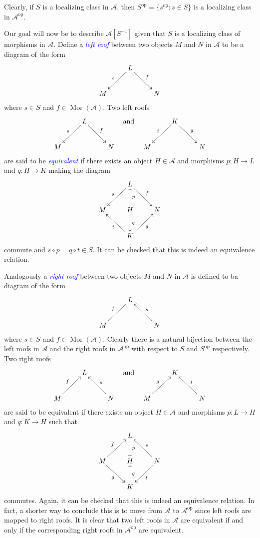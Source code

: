 \documentclass[11pt]{article}
\theoremstyle{thmstyle}
\theoremstyle{defstyle}
\newcommand{\scrA}{\mathscr{A}}
\newcommand{\define}[1]{\textcolor{blue}{\textit{#1}}}
\newcommand{\Mor}{\operatorname{Mor}}
\newcommand{\op}{\mathrm{op}}
\begin{document}
\begin{center}
Clearly, if $S$ is a localizing class in $\scrA$, then $S^\op = \{s^\op\colon s\in S\}$ is a localizing class in $\scrA^\op$.
\end{center}

Our goal will now be to describe $\scrA[S^{-1}]$ given that $S$ is a localizing class of morphisms in $\scrA$. Define a \define{left roof} between two objects $M$ and $N$ in $\scrA$ to be a diagram of the form 
\begin{equation*}
	\xymatrix {
		& L\ar[ld]_s\ar[rd]^f & \\
		M & & N
	}
\end{equation*}
where $s\in S$ and $f\in\Mor(\scrA)$. Two left roofs 
\begin{equation*}
	\xymatrix {
		& L\ar[ld]_s\ar[rd]^f & \\
		M & & N
	}
	\quad\text{and}\quad 
	\xymatrix {
		& K\ar[ld]_t\ar[rd]^g & \\
		M & & N
	}
\end{equation*}
are said to be \define{equivalent} if there exists an object $H\in\scrA$ and morphisms $p\colon H\to L$ and $q\colon H\to K$ making the diagram
\begin{equation*}
	\xymatrix {
		& L\ar[ld]_s\ar[rd]^f & \\
		M & H\ar[u]_{p}\ar[d]^{q} & N\\
		& K\ar[lu]^t\ar[ru]_g & 
	}
\end{equation*}
commute and $s\circ p = q\circ t\in S$. It can be checked that this is indeed an equivalence relation.

Analogously a \define{right roof} between two objects $M$ and $N$ in $\scrA$ is defined to ba diagram of the form 
\begin{equation*}
	\xymatrix {
		& L &\\
		M\ar[ru]^f & & N\ar[lu]_s
	}
\end{equation*}
where $s\in S$ and $f\in\Mor(\scrA)$. Clearly there is a natural bijection between the left roofs in $\scrA$ and the right roofs in $\scrA^\op$ with respect to $S$ and $S^\op$ respectively. Two right roofs 
\begin{equation*}
	\xymatrix {
		& L &\\
		M\ar[ru]^f & & N\ar[lu]_s
	}\quad\text{and}\quad
	\xymatrix {
		& K &\\
		M\ar[ru]^g & & N\ar[lu]_t
	}
\end{equation*}
are said to be equivalent if there exists an object $H\in\scrA$ and morphisms $p\colon L\to H$ and $q\colon K\to H$ such that 
\begin{equation*}
	\xymatrix {
		& L\ar[d]^p & \\
		M\ar[ru]^f\ar[rd]_g & H & N\ar[lu]_s\ar[ld]^t\\
		& K\ar[u]_q & 
	}
\end{equation*}
commutes. Again, it can be checked that this is indeed an equivalence relation. In fact, a shorter way to conclude this is to move from $\scrA$ to $\scrA^\op$ since left roofs are mapped to right roofs. It is clear that two left roofs in $\scrA$ are equivalent if and only if the corresponding right roofs in $\scrA^\op$ are equivalent.
\end{document}
